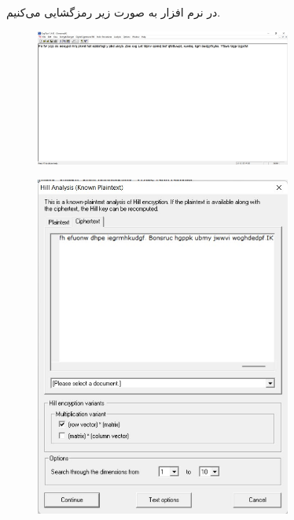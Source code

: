 \documentclass{article}
\begin{document}
\subsection{}
در نرم افزار  به صورت زیر رمزگشایی می‌کنیم.
\begin{figure}[H]
    \centering
    \includegraphics[width=0.75\textwidth]{figures/6a0.jpg}
    \caption
	{}
    \label{fig:fig1}
\end{figure}
\begin{figure}[H]
    \centering
    \includegraphics[width=0.75\textwidth]{figures/6a1.jpg}
    \caption
	{}
    \label{fig:fig1}
\end{figure}
\end{document}
